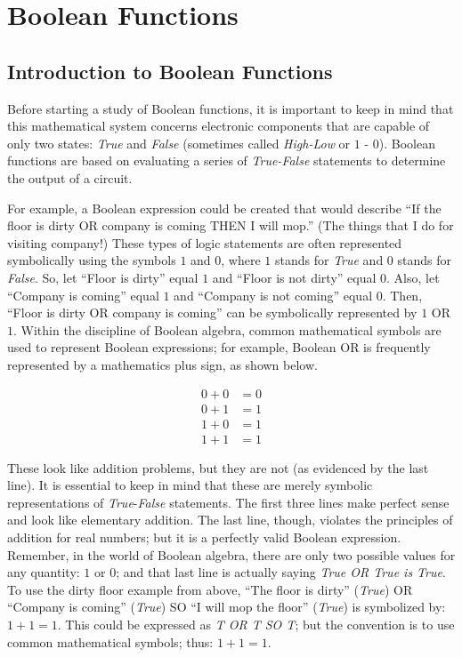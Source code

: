 \chapter{Boolean Functions}\label{ch04}
\section{Introduction to Boolean Functions}

Before starting a study of Boolean functions, it is important to keep in mind that this mathematical system concerns electronic components that are capable of only two states: \emph{True} and \emph{False} (sometimes called \emph{High-Low} or $ 1 $ - $ 0 $). Boolean functions are based on evaluating a series of \emph{\emph{True}-\emph{False}} statements to determine the output of a circuit.

For example, a Boolean expression could be created that would describe ``If the floor is dirty OR company is coming THEN I will mop.'' (The things that I do for visiting company!) These types of logic statements are often represented symbolically using the symbols $ 1 $ and $ 0 $, where $ 1 $ stands for \emph{True} and $ 0 $ stands for \emph{False}. So, let ``Floor is dirty'' equal $ 1 $ and ``Floor is not dirty'' equal $ 0 $. Also, let ``Company is coming'' equal $ 1 $ and ``Company is not coming'' equal $ 0 $. Then, ``Floor is dirty OR company is coming'' can be symbolically represented by $ 1 $ \textsf{OR} $ 1 $. Within the discipline of Boolean algebra, common mathematical symbols are used to represent Boolean expressions; for example, Boolean \textsf{OR} is frequently represented by a mathematics plus sign, as shown below. 

\begin{align}
  \label{04eq01}
  0 + 0 &= 0 \\
  \nonumber
  0 + 1 &= 1 \\
  \nonumber
  1 + 0 &= 1 \\
  \nonumber
  1 + 1 &= 1
\end{align}

These look like addition problems, but they are not (as evidenced by the last line). It is essential to keep in mind that these are merely symbolic representations of \emph{True}-\emph{False} statements. The first three lines make perfect sense and look like elementary addition. The last line, though, violates the principles of addition for real numbers; but it is a perfectly valid Boolean expression. Remember, in the world of Boolean algebra, there are only two possible values for any quantity: $ 1 $ or $ 0 $; and that last line is actually saying \emph{True \textsf{OR} True is True}. To use the dirty floor example from above, ``The floor is dirty'' (\emph{True}) OR ``Company is coming'' (\emph{True}) SO ``I will mop the floor'' (\emph{True}) is symbolized by: $ 1 + 1 = 1 $. This could be expressed as \emph{T \textsf{OR} T SO T}; but the convention is to use common mathematical symbols; thus: $ 1 + 1 = 1 $. 

